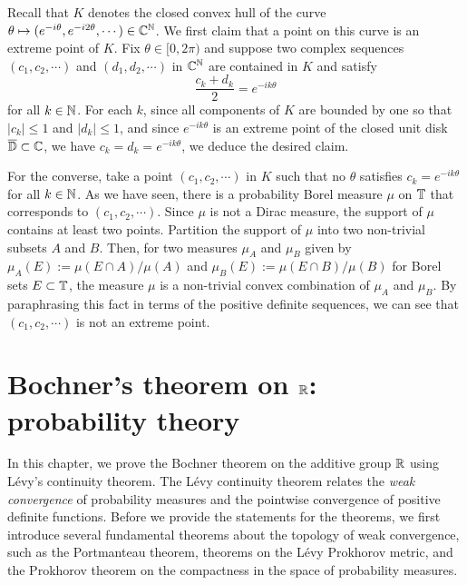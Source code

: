 \documentclass[a4paper]{article}
\begin{document}
\begin{pf}
Recall that $K$ denotes the closed convex hull of the curve $\theta\mapsto(e^{-i\theta},e^{-i2\theta},\cdots)\in\mathbb{C}^{\mathbb{N}}$.
We first claim that a point on this curve is an extreme point of $K$.
Fix $\theta\in[0,2\pi)$ and suppose two complex sequences $(c_1,c_2,\cdots)$ and $(d_1,d_2,\cdots)$ in $\mathbb{C}^{\mathbb{N}}$ are contained in $K$ and satisfy
\[\frac{c_k+d_k}2=e^{-ik\theta}\]
for all $k\in\mathbb{N}$.
For each $k$, since all components of $K$ are bounded by one so that $|c_k|\le1$ and $|d_k|\le1$, and since $e^{-ik\theta}$ is an extreme point of the closed unit disk $\overline{\mathbb{D}}\subset\mathbb{C}$, we have $c_k=d_k=e^{-ik\theta}$, we deduce the desired claim.

For the converse, take a point $(c_1,c_2,\cdots)$ in $K$ such that no $\theta$ satisfies $c_k=e^{-ik\theta}$ for all $k\in\mathbb{N}$.
As we have seen, there is a probability Borel measure $\mu$ on $\mathbb{T}$ that corresponds to $(c_1,c_2,\cdots)$.
Since $\mu$ is not a Dirac measure, the support of $\mu$ contains at least two points.
Partition the support of $\mu$ into two non-trivial subsets $A$ and $B$.
Then, for two measures $\mu_A$ and $\mu_B$ given by $\mu_A(E):=\mu(E\cap A)/\mu(A)$ and $\mu_B(E):=\mu(E\cap B)/\mu(B)$ for Borel sets $E\subset\mathbb{T}$, the measure $\mu$ is a non-trivial convex combination of $\mu_A$ and $\mu_B$.
By paraphrasing this fact in terms of the positive definite sequences, we can see that $(c_1,c_2,\cdots)$ is not an extreme point.
\end{pf}















\newpage
\section{Bochner's theorem on $\mathbb{R}$: probability theory}

In this chapter, we prove the Bochner theorem on the additive group $\mathbb{R}$ using L\'evy's continuity theorem.
The L\'evy continuity theorem relates the \emph{weak convergence} of probability measures and the pointwise convergence of positive definite functions.
Before we provide the statements for the theorems, we first introduce several fundamental theorems about the topology of weak convergence, such as the Portmanteau theorem, theorems on the L\'evy Prokhorov metric, and the Prokhorov theorem on the compactness in the space of probability measures.
\end{document}
